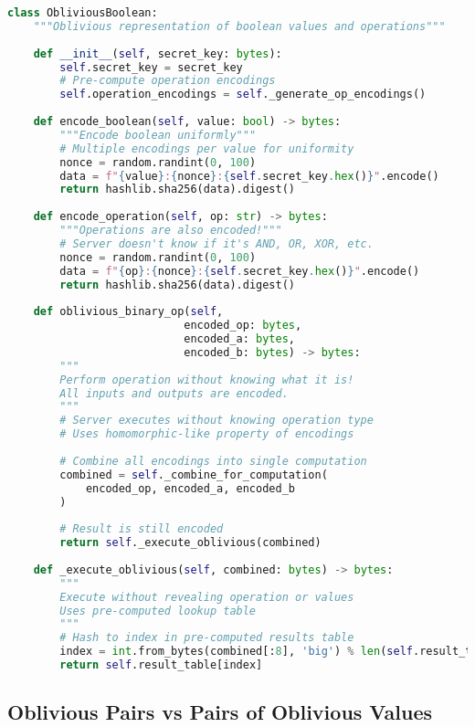 \begin{lstlisting}[language=Python, caption={Oblivious boolean operations}]
class ObliviousBoolean:
    """Oblivious representation of boolean values and operations"""
    
    def __init__(self, secret_key: bytes):
        self.secret_key = secret_key
        # Pre-compute operation encodings
        self.operation_encodings = self._generate_op_encodings()
        
    def encode_boolean(self, value: bool) -> bytes:
        """Encode boolean uniformly"""
        # Multiple encodings per value for uniformity
        nonce = random.randint(0, 100)
        data = f"{value}:{nonce}:{self.secret_key.hex()}".encode()
        return hashlib.sha256(data).digest()
    
    def encode_operation(self, op: str) -> bytes:
        """Operations are also encoded!"""
        # Server doesn't know if it's AND, OR, XOR, etc.
        nonce = random.randint(0, 100)
        data = f"{op}:{nonce}:{self.secret_key.hex()}".encode()
        return hashlib.sha256(data).digest()
    
    def oblivious_binary_op(self, 
                           encoded_op: bytes,
                           encoded_a: bytes, 
                           encoded_b: bytes) -> bytes:
        """
        Perform operation without knowing what it is!
        All inputs and outputs are encoded.
        """
        # Server executes without knowing operation type
        # Uses homomorphic-like property of encodings
        
        # Combine all encodings into single computation
        combined = self._combine_for_computation(
            encoded_op, encoded_a, encoded_b
        )
        
        # Result is still encoded
        return self._execute_oblivious(combined)
    
    def _execute_oblivious(self, combined: bytes) -> bytes:
        """
        Execute without revealing operation or values
        Uses pre-computed lookup table
        """
        # Hash to index in pre-computed results table
        index = int.from_bytes(combined[:8], 'big') % len(self.result_table)
        return self.result_table[index]
\end{lstlisting}

\subsection{Oblivious Pairs vs Pairs of Oblivious Values}

